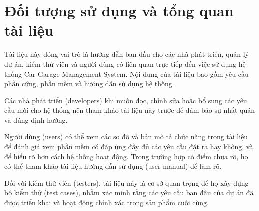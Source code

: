 \documentclass[../main.tex]{subfiles}
\begin{document}
\section{Đối tượng sử dụng và tổng quan tài liệu}
Tài liệu này đóng vai trò là hướng dẫn ban đầu cho các nhà phát triển, quản lý dự án, kiểm thử viên và người dùng có liên quan trực tiếp đến việc sử dụng hệ thống Car Garage Management System. Nội dung của tài liệu bao gồm yêu cầu phần cứng, phần mềm và hướng dẫn sử dụng hệ thống.

Các nhà phát triển (developers) khi muốn đọc, chỉnh sửa hoặc bổ sung các yêu cầu mới cho hệ thống nên tham khảo tài liệu này trước để đảm bảo sự nhất quán và đúng định hướng.

Người dùng (users) có thể xem các sơ đồ và bản mô tả chức năng trong tài liệu để đánh giá xem phần mềm có đáp ứng đầy đủ các yêu cầu đặt ra hay không, và để hiểu rõ hơn cách hệ thống hoạt động. Trong trường hợp có điểm chưa rõ, họ có thể tham khảo tài liệu hướng dẫn sử dụng (user manual) để làm rõ. 

Đối với kiểm thử viên (testers), tài liệu này là cơ sở quan trọng để họ xây dựng bộ kiểm thử (test cases), nhằm xác minh rằng các yêu cầu ban đầu của dự án đã được triển khai và hoạt động chính xác trong sản phẩm cuối cùng.
\end{document}
